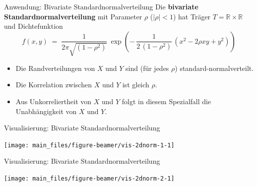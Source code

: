 \documentclass[
  10pt,
  ignorenonframetext,
]{beamer}
\begin{document}
\begin{frame}{Anwendung: Bivariate Standardnormalverteilung}
\label{anwendung-bivariate-standardnormalverteilung}
Die \textbf{bivariate Standardnormalverteilung} mit Parameter \(\rho\)
(\(|\rho| < 1\)) hat Träger \(T = \mathbb R \times \mathbb R\) und
Dichtefunktion \[
f(x,y) \; = \; \frac{1}{2 \pi \sqrt{(1 - \rho^2)}} \: \exp
\left(
- \, \frac{1}{2 \, (1 - \rho^2)} \, (x^2 - 2 \rho x y + y^2)
\right)
\]

\begin{itemize}
\item
  Die Randverteilungen von \(X\) und \(Y\) sind (für jedes \(\rho\))
  standard-normalverteilt.\\
\item
  Die Korrelation zwischen \(X\) und \(Y\) ist gleich \(\rho\).\\
\item
  Aus Unkorreliertheit von \(X\) und \(Y\) folgt in diesem Spezialfall
  die Unabhängigkeit von \(X\) und \(Y\).
\end{itemize}
\end{frame}

\begin{frame}{Visualisierung: Bivariate Standardnormalverteilung}
\label{visualisierung-bivariate-standardnormalverteilung}
\scriptsize

\begin{center}\texttt{[image: main\_files/figure-beamer/vis-2dnorm-1-1]} \end{center}

\normalsize
\end{frame}

\begin{frame}{Visualisierung: Bivariate Standardnormalverteilung}
\label{visualisierung-bivariate-standardnormalverteilung-1}
\scriptsize

\begin{center}\texttt{[image: main\_files/figure-beamer/vis-2dnorm-2-1]} \end{center}

\normalsize
\end{frame}
\end{document}
